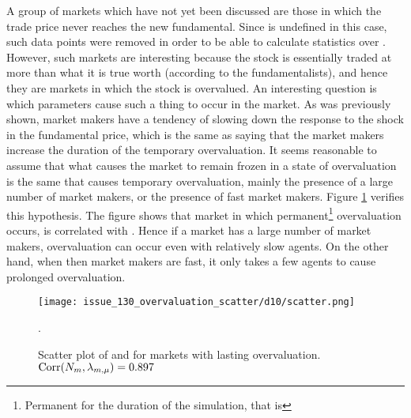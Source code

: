 A group of markets which have not yet been discussed are those in which the trade price never reaches the new fundamental. Since \timetoreachnewfundamental{} is undefined in this case, such data points were removed in order to be able to calculate statistics over \timetoreachnewfundamental. However, such markets are interesting because the stock is essentially traded at more than what it is true worth (according to the fundamentalists), and hence they are markets in which the stock is overvalued. An interesting question is which parameters cause such a thing to occur in the market. As was previously shown, market makers have a tendency of slowing down the response to the shock in the fundamental price, which is the same as saying that the market makers increase the duration of the temporary overvaluation. It seems reasonable to assume that what causes the market to remain frozen in a state of overvaluation is the same that causes temporary overvaluation, mainly the presence of a large number of market makers, or the presence of fast market makers. Figure \ref{figure:overvaluation_scatter} verifies this hypothesis. The figure shows that market in which permanent\footnote{Permanent for the duration of the simulation, that is} overvaluation occurs, \ssmmnAgents{} is correlated with \ssmmlatencymu{}. Hence if a market has a large number of market makers, overvaluation can occur even with relatively slow agents. On the other hand, when then market makers are fast, it only takes a few agents to cause prolonged overvaluation.
 
 \begin{figure}
 \centering
 \texttt{[image: issue\_130\_overvaluation\_scatter/d10/scatter.png]}
\caption{Scatter plot of \ssmmnAgents{} and \ssmmlatencymu{} for markets with lasting overvaluation. $\text{Corr}(N_{m}, \lambda_{m, \mu}) = 0.897$}.
\label{figure:overvaluation_scatter}
 \end{figure}



